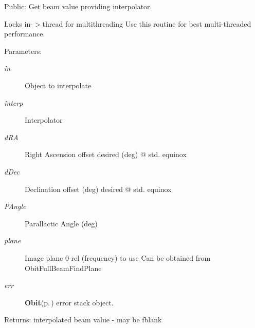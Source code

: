 Public: Get beam value providing interpolator. 

Locks in-$>$thread for multithreading Use this routine for best multi-threaded performance. \begin{Desc}
\item[Parameters:]
\begin{description}
\item[{\em in}]Object to interpolate \item[{\em interp}]Interpolator \item[{\em d\-RA}]Right Ascension offset desired (deg) @ std. equinox \item[{\em d\-Dec}]Declination offset (deg) desired @ std. equinox \item[{\em PAngle}]Parallactic Angle (deg) \item[{\em plane}]Image plane 0-rel (frequency) to use Can be obtained from Obit\-Full\-Beam\-Find\-Plane \item[{\em err}]{\bf Obit}{\rm (p.\,\pageref{structObit})} error stack object. \end{description}
\end{Desc}
\begin{Desc}
\item[Returns:]interpolated beam value - may be fblank \end{Desc}
